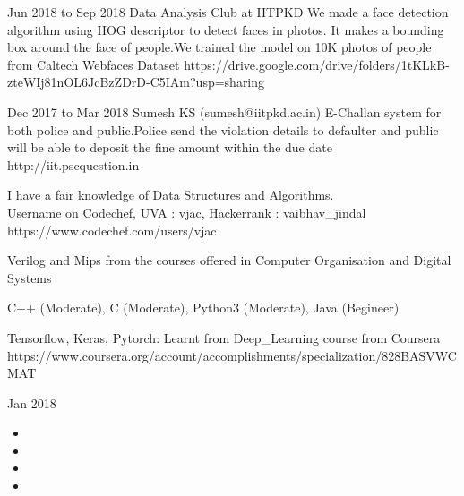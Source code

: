 {Jun 2018 to Sep 2018}
{Data Analysis Club at IITPKD}
{We made a face detection algorithm using HOG descriptor to detect faces in photos. It makes a bounding box around the face of people.We trained the model on 10K photos of people from Caltech Webfaces Dataset}
{https://drive.google.com/drive/folders/1tKLkB-zteWIj81nOL6JcBzZDrD-C5IAm?usp=sharing}

{Dec 2017 to Mar 2018}
{Sumesh KS (sumesh@iitpkd.ac.in)}
{E-Challan system for both police and public.Police send the violation details to defaulter and public will be able to deposit the fine amount within the due date}
{http://iit.pscquestion.in}


{I have a fair knowledge of Data Structures and Algorithms. \\Username on Codechef, UVA : vjac, Hackerrank : vaibhav\_jindal}
{https://www.codechef.com/users/vjac} 

{Verilog and Mips from the courses offered in Computer Organisation and Digital Systems}
{}                                                      %

{C++ (Moderate), C (Moderate), Python3 (Moderate), Java (Begineer)}
{}                                                      %

{Tensorflow, Keras, Pytorch: Learnt from Deep\_Learning course from Coursera}
{https://www.coursera.org/account/accomplishments/specialization/828BASVWCMAT}


{Jan 2018}


\begin{itemize}
	\item {}
	\item{}
	\item{}
	\item{}
\end{itemize}


